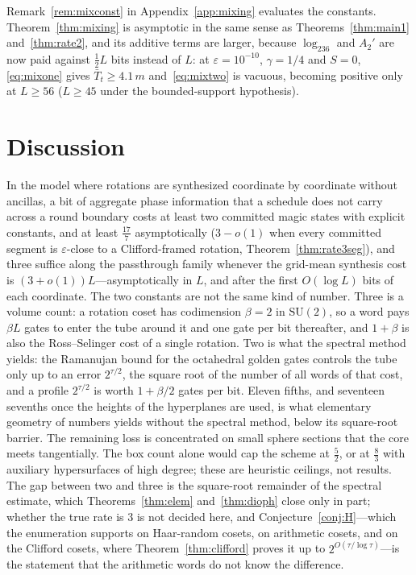 \documentclass[aps,prx,twocolumn,superscriptaddress,nofootinbib,longbibliography]{revtex4-2}
\theoremstyle{plain}
\theoremstyle{definition}
\theoremstyle{remark}
\newcommand{\SU}{\mathrm{SU}(2)}
\begin{document}
Remark~\ref{rem:mixconst} in Appendix~\ref{app:mixing} evaluates the constants. Theorem~\ref{thm:mixing} is asymptotic in the same sense as Theorems~\ref{thm:main1} and~\ref{thm:rate2}, and its additive terms are larger, because $\log_236$ and $A_2'$ are now paid against $\tfrac12L$ bits instead of $L$: at $\varepsilon=10^{-10}$, $\gamma=1/4$ and $S=0$, \eqref{eq:mixone} gives $\bar T_t\ge4.1\,m$ and~\eqref{eq:mixtwo} is vacuous, becoming positive only at $L\ge56$ ($L\ge45$ under the bounded-support hypothesis).

\section{Discussion}\label{sec:disc}

In the model where rotations are synthesized coordinate by coordinate without ancillas, a bit of aggregate phase information that a schedule does not carry across a round boundary costs at least two committed magic states with explicit constants, and at least $\tfrac{17}7$ asymptotically ($3-o(1)$ when every committed segment is $\varepsilon$-close to a Clifford-framed rotation, Theorem~\ref{thm:rate3seg}), and three suffice along the passthrough family whenever the grid-mean synthesis cost is $(3+o(1))L$---asymptotically in $L$, and after the first $O(\log L)$ bits of each coordinate. The two constants are not the same kind of number. Three is a volume count: a rotation coset has codimension $\beta=2$ in $\SU$, so a word pays $\beta L$ gates to enter the tube around it and one gate per bit thereafter, and $1+\beta$ is also the Ross--Selinger cost of a single rotation. Two is what the spectral method yields: the Ramanujan bound for the octahedral golden gates controls the tube only up to an error $2^{\tau/2}$, the square root of the number of all words of that cost, and a profile $2^{\tau/2}$ is worth $1+\beta/2$ gates per bit. Eleven fifths, and seventeen sevenths once the heights of the hyperplanes are used, is what elementary geometry of numbers yields without the spectral method, below its square-root barrier. The remaining loss is concentrated on small sphere sections that the core meets tangentially. The box count alone would cap the scheme at $\tfrac52$, or at $\tfrac83$ with auxiliary hypersurfaces of high degree; these are heuristic ceilings, not results. The gap between two and three is the square-root remainder of the spectral estimate, which Theorems~\ref{thm:elem} and~\ref{thm:dioph} close only in part; whether the true rate is $3$ is not decided here, and Conjecture~\ref{conj:H}---which the enumeration supports on Haar-random cosets, on arithmetic cosets, and on the Clifford cosets, where Theorem~\ref{thm:clifford} proves it up to $2^{O(\tau/\log\tau)}$---is the statement that the arithmetic words do not know the difference.
\end{document}
